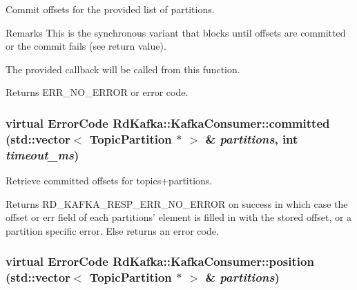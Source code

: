 Commit offsets for the provided list of partitions. \begin{DoxyRemark}{Remarks}
This is the synchronous variant that blocks until offsets are committed or the commit fails (see return value).

The provided callback will be called from this function.
\end{DoxyRemark}
\begin{DoxyReturn}{Returns}
ERR\_\-NO\_\-ERROR or error code. 
\end{DoxyReturn}
\hypertarget{classRdKafka_1_1KafkaConsumer_aad4b300803fd1c9403c165b9a6431612}{
\subsubsection[{committed}]{\setlength{\rightskip}{0pt plus 5cm}virtual ErrorCode RdKafka::KafkaConsumer::committed (std::vector$<$ {\bf TopicPartition} $\ast$ $>$ \& {\em partitions}, \/  int {\em timeout\_\-ms})}}
\label{classRdKafka_1_1KafkaConsumer_aad4b300803fd1c9403c165b9a6431612}


Retrieve committed offsets for topics+partitions. \begin{DoxyReturn}{Returns}
RD\_\-KAFKA\_\-RESP\_\-ERR\_\-NO\_\-ERROR on success in which case the {\ttfamily offset} or {\ttfamily err} field of each {\ttfamily partitions'} element is filled in with the stored offset, or a partition specific error. Else returns an error code. 
\end{DoxyReturn}
\hypertarget{classRdKafka_1_1KafkaConsumer_a49705c19baac7e00f6558fb7b4410a57}{
\subsubsection[{position}]{\setlength{\rightskip}{0pt plus 5cm}virtual ErrorCode RdKafka::KafkaConsumer::position (std::vector$<$ {\bf TopicPartition} $\ast$ $>$ \& {\em partitions})}}
\label{classRdKafka_1_1KafkaConsumer_a49705c19baac7e00f6558fb7b4410a57}



